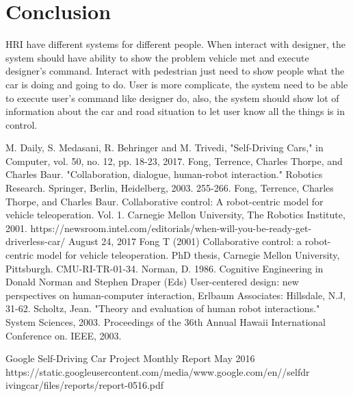 \documentclass[a4paper, 10pt, conference]{ieeeconf}      %
\begin{document}
\section{Conclusion}
HRI have different systems for different people. When interact with designer, the system should have ability to show the problem vehicle met and execute designer’s command. Interact with pedestrian just need to show people what the car is doing and going to do. User is more complicate, the system need to be able to execute user’s command like designer do, also, the system should show lot of information about the car and road situation to let user know all the things is in control.


\addtolength{\textheight}{-12cm}   %


\begin{thebibliography}{99}

 M. Daily, S. Medasani, R. Behringer and M. Trivedi, "Self-Driving Cars," in Computer, vol. 50, no. 12, pp. 18-23, 2017. 
 Fong, Terrence, Charles Thorpe, and Charles Baur. "Collaboration, dialogue, human-robot interaction." Robotics Research. Springer, Berlin, Heidelberg, 2003. 255-266.
 Fong, Terrence, Charles Thorpe, and Charles Baur. Collaborative control: A robot-centric model for vehicle teleoperation. Vol. 1. Carnegie Mellon University, The Robotics Institute, 2001.
 https://newsroom.intel.com/editorials/when-will-you-be-ready-get-driverless-car/ August 24, 2017
 Fong T (2001) Collaborative control: a robot-centric model for vehicle teleoperation. PhD thesis, Carnegie Mellon University, Pittsburgh. CMU-RI-TR-01-34.
 Norman, D. 1986. Cognitive Engineering in Donald Norman and Stephen Draper (Eds) User-centered design: new perspectives on human-computer interaction, Erlbaum Associates: Hillsdale, N.J, 31-62.
 Scholtz, Jean. "Theory and evaluation of human robot interactions." System Sciences, 2003. Proceedings of the 36th Annual Hawaii International Conference on. IEEE, 2003.


 Google Self-Driving Car Project Monthly Report May 2016 https://static.googleusercontent.com/media/www.google.com/en//selfdr ivingcar/files/reports/report-0516.pdf


\end{thebibliography}
\end{document}
